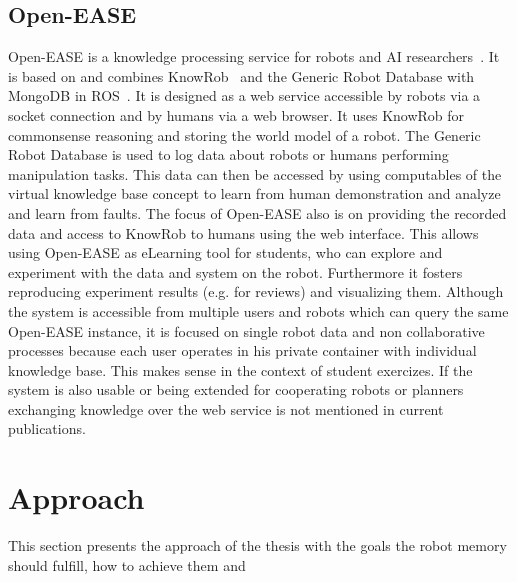 \documentclass[a4paper,11pt]{article}
\begin{document}
\subsection{Open-EASE}
\label{sec:openease}
Open-EASE is a knowledge processing service for robots and AI
researchers~\cite{OpenEASE}. It is based on and combines
KnowRob~\cite{KnowRob} and the Generic Robot Database with MongoDB in
ROS~\cite{RoboDB}. It is designed as a web service accessible by
robots via a socket connection and by humans via a web browser. It
uses KnowRob for commonsense reasoning and storing the world model of
a robot. The Generic Robot Database is used to log data about robots
or humans performing manipulation tasks. This data can then be
accessed by using computables of the virtual knowledge base concept to
learn from human demonstration and analyze and learn from faults. The
focus of Open-EASE also is on providing the recorded data and access
to KnowRob to humans using the web interface. This allows using
Open-EASE as eLearning tool for students, who can explore and
experiment with the data and system on the robot. Furthermore it
fosters reproducing experiment results (e.g. for reviews) and
visualizing them. Although the system is accessible from multiple
users and robots which can query the same Open-EASE instance, it is
focused on single robot data and non collaborative processes because
each user operates in his private container with individual knowledge
base. This makes sense in the context of student exercizes. If the
system is also usable or being extended for cooperating robots or
planners exchanging knowledge over the web service is not mentioned in
current publications.


\section{Approach}
\label{sec:approach}
This section presents the approach of the thesis with the goals the robot memory should fulfill, how to achieve them and 
\end{document}
